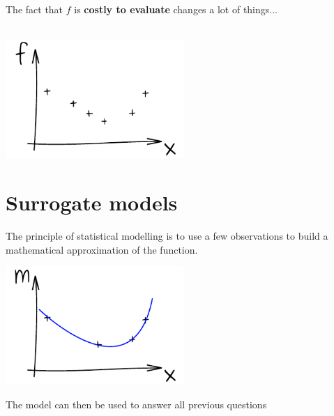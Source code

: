 \documentclass{beamer}
\begin{document}
\begin{frame}{}
The fact that $f$ is \textbf{costly to evaluate} changes a lot of things...\\
\vspace{5mm}
\\
\vspace{5mm}
\begin{center}
\includegraphics[height=4.5cm]{figures/ink_fX}
\end{center}
\end{frame}

\section[Surrogates]{Surrogate models}

\begin{frame}{}
The principle of statistical modelling is to use a few observations to build a mathematical approximation of the function. 
\begin{center}
\includegraphics[height=4.5cm]{figures/ink_m}
\end{center}
The model can then be used to answer all previous questions
\end{frame}
\end{document}
